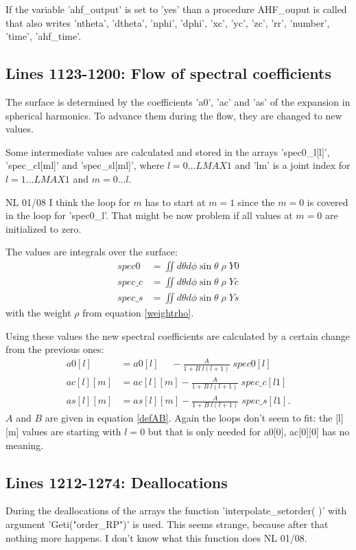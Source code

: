 \documentclass[11pt,a4paper,twoside]{article}
\begin{document}
If the variable 'ahf\_output' is set to 'yes' than a procedure
AHF\_ouput is called that also writes 
'ntheta', 'dtheta', 'nphi', 'dphi', 'xc', 'yc', 'zc', 'rr', 'number', 
'time', 'ahf\_time'.

\subsection{Lines 1123-1200: Flow of spectral coefficients}
The surface is determined by the coefficients 'a0', 'ac' and
'as' of the expansion in spherical harmonics. To advance them during
the flow, they are changed to new values.

Some intermediate values are calculated and stored in the 
arrays 'spec0\_l[l]', 'spec\_cl[ml]' and 'spec\_sl[ml]', where
$l = 0 \dots LMAX1$ and 'lm' is a joint index for $l=1 \dots LMAX1$ and
$m=0\dots l$.

\warningsymbol NL 01/08 I think the loop for $m$ has to start at $m=1$ since
the $m=0$ is covered in the loop for 'spec0\_l'. That might be now problem
if all values at $m=0$ are initialized to zero.

The values are integrals over the surface:
\begin{align}
  spec0  &= \iint d\theta d\phi \sin\theta \;\rho \;Y0\\
  spec\_c&= \iint d\theta d\phi \sin\theta \;\rho \;Y\!c\\
  spec\_s&= \iint d\theta d\phi \sin\theta \;\rho \;Y\!s
\end{align}
with the weight $\rho$ from equation \eqref{weightrho}.

Using these values the new spectral coefficients are calculated 
by a certain change from the previous ones:
\begin{align}
  a0[l]    &= a0[l]\quad\;-\frac {A}{1+B \;l (l+1)} \;spec0[l] \\
  ac[l][m] &= ac[l][m]    -\frac {A}{1+B \;l (l+1)} \;spec\_c[l1] \\
  as[l][m] &= as[l][m]    -\frac {A}{1+B \;l (l+1)} \;spec\_s[l1].
\end{align}
$A$ and $B$ are given in equation \eqref{defAB}.
\warningsymbol Again the loops don't seem to fit: the [l][m] values are
starting with $l=0$ but that is only needed for a0[0], ac[0][0] has no meaning.


\subsection{Lines 1212-1274: Deallocations}
During the deallocations of the arrays the
function 'interpolate\_setorder( )' with argument 'Geti("order\_RP")' is used.
This seems strange, because after that nothing more happens.
I don't know what this function does NL 01/08.
\end{document}
